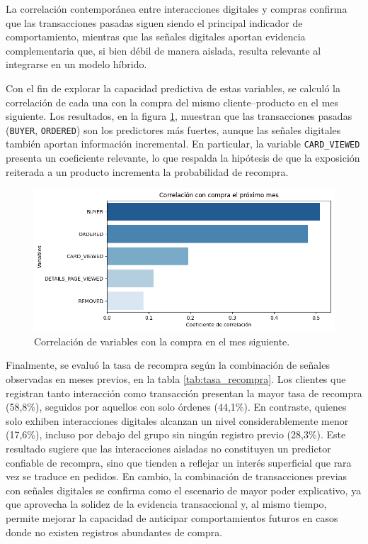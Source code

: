 La correlación contemporánea entre interacciones digitales y compras confirma que las transacciones pasadas siguen siendo el principal indicador de comportamiento, mientras que las señales digitales aportan evidencia complementaria que, si bien débil de manera aislada, resulta relevante al integrarse en un modelo híbrido.

Con el fin de explorar la capacidad predictiva de estas variables, se calculó la correlación de cada una con la compra del mismo cliente–producto en el mes siguiente. Los resultados, en la figura \ref{fig:corr_prox_mes},  muestran que las transacciones pasadas (\texttt{BUYER}, \texttt{ORDERED}) son los predictores más fuertes, aunque las señales digitales también aportan información incremental. En particular, la variable \texttt{CARD\_VIEWED} presenta un coeficiente relevante, lo que respalda la hipótesis de que la exposición reiterada a un producto incrementa la probabilidad de recompra.

\begin{figure}[htpb]
	\centering
	\includegraphics[scale=.5]{./Figures/corr_prox_mes.png}
	\caption{Correlación de variables con la compra en el mes siguiente.}
	\label{fig:corr_prox_mes}
\end{figure}

Finalmente, se evaluó la tasa de recompra según la combinación de señales observadas en meses previos, en la tabla \ref{tab:tasa_recompra}. Los clientes que registran tanto interacción como transacción presentan la mayor tasa de recompra (58,8\%), seguidos por aquellos con solo órdenes (44,1\%). En contraste, quienes solo exhiben interacciones digitales alcanzan un nivel considerablemente menor (17,6\%), incluso por debajo del grupo sin ningún registro previo (28,3\%). Este resultado sugiere que las interacciones aisladas no constituyen un predictor confiable de recompra, sino que tienden a reflejar un interés superficial que rara vez se traduce en pedidos. En cambio, la combinación de transacciones previas con señales digitales se confirma como el escenario de mayor poder explicativo, ya que aprovecha la solidez de la evidencia transaccional y, al mismo tiempo, permite mejorar la capacidad de anticipar comportamientos futuros en casos donde no existen registros abundantes de compra.

